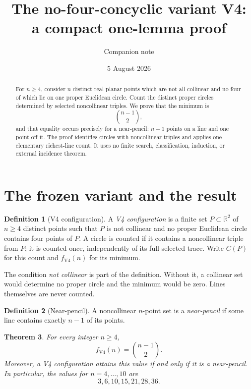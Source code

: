 \documentclass[11pt]{article}
\title{The no-four-concyclic variant V4:\\[1mm]a compact one-lemma proof}
\author{Companion note}
\date{5 August 2026}
\newtheorem{theorem}{Theorem}[section]
\theoremstyle{definition}
\newtheorem{definition}[theorem]{Definition}
\theoremstyle{remark}
\newcommand{\R}{\mathbb R}
\begin{document}
\maketitle

\begin{abstract}
For \(n\ge4\), consider \(n\) distinct real planar points which are not all
collinear and no four of which lie on one proper Euclidean circle.  Count
the distinct proper circles determined by selected noncollinear triples.
We prove that the minimum is
\[
 \binom{n-1}{2},
\]
and that equality occurs precisely for a near-pencil: \(n-1\) points on a
line and one point off it.  The proof identifies circles with noncollinear
triples and applies one elementary richest-line count.  It uses no finite
search, classification, induction, or external incidence theorem.
\end{abstract}

\section{The frozen variant and the result}

\begin{definition}[V4 configuration]\label{def:v4}
A \emph{V4 configuration} is a finite set \(P\subset\R^2\) of \(n\ge4\)
distinct points such that \(P\) is not collinear and no proper Euclidean
circle contains four points of \(P\).  A circle is counted if it contains a
noncollinear triple from \(P\); it is counted once, independently of its
full selected trace.  Write \(C(P)\) for this count and \(f_{\mathrm{V4}}(n)\)
for its minimum.
\end{definition}

The condition \emph{not collinear} is part of the definition.  Without it,
a collinear set would determine no proper circle and the minimum would be
zero.  Lines themselves are never counted.

\begin{definition}[Near-pencil]
A noncollinear \(n\)-point set is a \emph{near-pencil} if some line contains
exactly \(n-1\) of its points.
\end{definition}

\begin{theorem}\label{thm:v4}
For every integer \(n\ge4\),
\begin{equation}\label{eq:v4-value}
 \boxed{f_{\mathrm{V4}}(n)=\binom{n-1}{2}}.
\end{equation}
Moreover, a V4 configuration attains this value if and only if it is a
near-pencil.  In particular, the values for \(n=4,\ldots,10\) are
\[
 3,6,10,15,21,28,36.
\]
\end{theorem}
\end{document}
